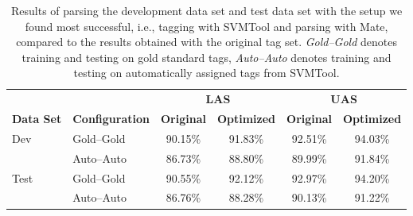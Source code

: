 \documentclass[a4paper,12pt,english]{book}
\begin{document}
\begin{table}
    \centering
    \smaller[0.5]
    \begin{tabular}{@{}llcccc@{}}
        \toprule
        & & \multicolumn{2}{c}{\textbf{LAS}}
        & \multicolumn{2}{c}{\textbf{UAS}} \\
        \cmidrule(lr){3-4}
        \cmidrule(lr){5-6}
        \textbf{Data Set} & \textbf{Configuration} & \textbf{Original} &
        \textbf{Optimized} & \textbf{Original} & \textbf{Optimized} \\
        \midrule
        \multirow{2}{*}{Dev}
        & Gold--Gold & 90.15\% & 91.83\% & 92.51\% & 94.03\% \\
        & Auto--Auto & 86.73\% & 88.80\% & 89.99\% & 91.84\% \\
        \midrule
        \multirow{2}{*}{Test}
        & Gold--Gold & 90.55\% & 92.12\% & 92.97\% & 94.20\% \\
        & Auto--Auto & 86.76\% & 88.28\% & 90.13\% & 91.22\% \\
        \bottomrule
    \end{tabular}
    \caption{Results of parsing the development data set and test data set with
        the setup we found most successful, i.e., tagging with SVMTool and
        parsing with Mate, compared to the results obtained with the original
        tag set. \emph{Gold--Gold} denotes training and testing on gold
        standard tags, \emph{Auto--Auto} denotes training and testing on
        automatically assigned tags from SVMTool.}
    \label{finaloptimizedeval}
\end{table}
\end{document}
